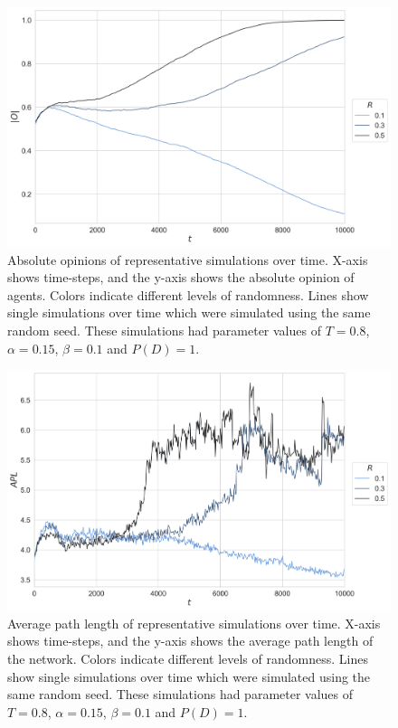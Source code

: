 \documentclass[11pt]{article}
\begin{document}
\begin{figure}[H]
    \centering
    \includegraphics[width=.7\linewidth]{../plots/example/Example_Absolute_Opinion.png}
  \caption{Absolute opinions of representative simulations over time. X-axis shows time-steps, and the y-axis shows the absolute opinion of agents. Colors indicate different levels of randomness. Lines show single simulations over time which were simulated using the same random seed. These simulations had parameter values of $T = 0.8$, $\alpha = 0.15$, $\beta = 0.1$ and $P(D)=1$.}
  \label{fig:example_abs_opinion}
\end{figure}

\begin{figure}[H]
    \centering
    \includegraphics[width=.7\linewidth]{../plots/example/Example_Average_Path_Length.png}
  \caption{Average path length of representative simulations over time. X-axis shows time-steps, and the y-axis shows the average path length of the network. Colors indicate different levels of randomness. Lines show single simulations over time which were simulated using the same random seed. These simulations had parameter values of $T = 0.8$, $\alpha = 0.15$, $\beta = 0.1$ and $P(D)=1$.}
  \label{fig:example_path}
\end{figure}
\end{document}
